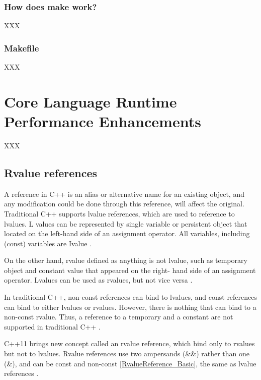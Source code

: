 \documentclass[11pt]{report}
\begin{document}
\subsection{How does make work?}
\label{subsec: how make work}

XXX

\subsection{Makefile}
\label{subsec: makefile}

XXX

\chapter{Core Language Runtime Performance Enhancements}
\label{chapter: Runtime Performance Enhancements}

XXX

\section{Rvalue references}
\label{section: Rvalue references}
A reference in C++ is an alias or alternative name for an existing object, and any modification could be done through this reference, will affect the original. Traditional C++ supports lvalue references, which are used to reference to lvalues. L values can be represented by single variable or persistent object that located on the left-hand side of an assignment operator. All variables, including (const) variables are Ivalue \cite{Gregorie:professionalcpp}.


On the other hand, rvalue defined as anything is not lvalue, such as temporary object and constant value that appeared on the right- hand side of an assignment operator.  Lvalues can be used as rvalues, but not vice versa \cite{Gregorie:professionalcpp}.


In traditional C++, non-const references can bind to lvalues, and const references can bind to either lvalues or rvalues. However, there is nothing that can bind to a non-const rvalue. Thus, a reference to a temporary and a constant are not supported in traditional C++ \cite{Stroustrup:2012:Cpp11}.


C++11 brings new concept called an rvalue reference, which bind only to rvalues but not to lvalues. Rvalue references use two ampersands (\&\&) rather than one (\&), and can be const and non-const \ref{RvalueReference_Basic}, the same as lvalue references \cite{Gregorie:professionalcpp}.
\end{document}
